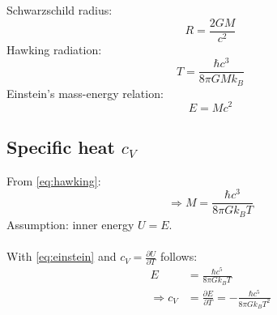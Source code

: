 Schwarzschild radius:
\begin{equation}
    R=\frac{2GM}{c^2}
    \label{eq:schwarzschild}
\end{equation}
Hawking radiation:
\begin{equation}
    T=\frac{\hbar c^3}{8\pi GMk_B}
    \label{eq:hawking}
\end{equation}
Einstein's mass-energy relation:
\begin{equation}
    E=Mc^2
    \label{eq:einstein}
\end{equation}

\subsection{Specific heat $c_V$}
    From \autoref{eq:hawking}:
    \begin{equation}
        \Rightarrow M=\frac{\hbar c^3}{8\pi Gk_BT}
    \end{equation}
    Assumption: inner energy $U=E$. \\
    \\
    With \autoref{eq:einstein} and $c_V=\frac{\partial U}{\partial T}$ follows:
    \begin{align}
        E&=\frac{\hbar c^5}{8\pi Gk_BT} \\
        \Rightarrow c_V&=\frac{\partial E}{\partial T}
        =-\frac{\hbar c^5}{8\pi Gk_BT^2}
    \end{align}

